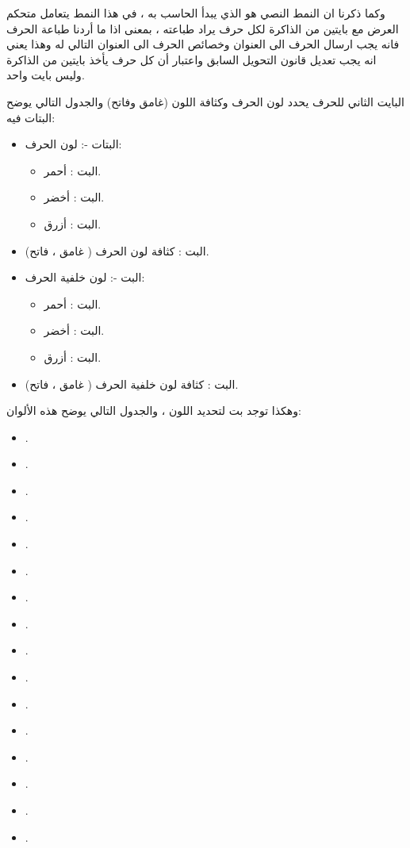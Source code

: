 \documentclass[document.tex]{subfiles}
\begin{document}
وكما ذكرنا ان النمط النصي  هو الذي يبدأ الحاسب به ، في هذا النمط يتعامل متحكم العرض مع بايتين من الذاكرة لكل حرف يراد طباعته ، بمعنى اذا ما أردنا طباعة الحرف  فانه يجب ارسال الحرف الى العنوان  وخصائص الحرف الى العنوان التالي له  وهذا يعني انه يجب تعديل قانون التحويل السابق واعتبار أن كل حرف يأخذ بايتين من الذاكرة وليس بايت واحد.

البايت الثاني للحرف يحدد لون الحرف وكثافة اللون (غامق وفاتح) والجدول التالي يوضح البتات فيه:

\begin{itemize}
\item البتات -: لون الحرف:
\begin{itemize}
\item البت : أحمر.
\item البت : أخضر.
\item البت : أزرق.

\end{itemize}

\item البت : كثافة لون الحرف (  غامق ،  فاتح).
\item البت -: لون خلفية الحرف:
\begin{itemize}
\item البت : أحمر.
\item البت : أخضر.
\item البت : أزرق.

\end{itemize}
\item البت : كثافة لون خلفية الحرف (  غامق ،  فاتح).


\end{itemize}

وهكذا توجد  بت لتحديد اللون ، والجدول التالي يوضح هذه الألوان:
\begin{english}
\begin{itemize}
\item {}.
\item {}.
\item {}.
\item {}.
\item {}.
\item {}.
\item {}.
\item {}.
\item {}.
\item {}.
\item {}.
\item {}.
\item {}.
\item {}.
\item {}.
\item {}.

\end{itemize}
\end{english}
\end{document}
